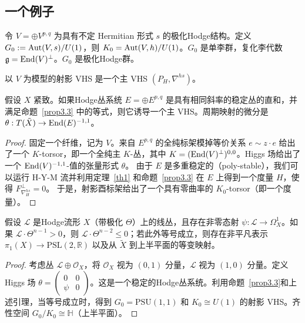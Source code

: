 \subsection{一个例子}

令 $V = \oplus V^{p,q}$ 为具有不定 Hermitian 形式 $s$ 的极化Hodge结构。定义 $G_0 := \operatorname{Aut}(V, s)/U(1)$，则 $K_0 = \operatorname{Aut}(V, h)/U(1)$。$G_0$ 是单李群，复化李代数 $\mathfrak{g} = \operatorname{End}(V)^\perp$。$G_0$ 是极化Hodge群。

\begin{definition}
以 $V$ 为模型的射影 VHS 是一个主 VHS $(P_H, \nabla^{hs})$。
\end{definition}

\begin{lemma}\label{lemmabundletovhs}
假设 $X$ 紧致。如果Hodge丛系统 $E = \oplus E^{p,q}$ 是具有相同斜率的稳定丛的直和，并满足命题~\ref{prop3.3} 中的等式，则它诱导一个主 VHS。周期映射的微分是 $\theta: T(\tilde{X}) \to \operatorname{End}(E)^{-1, 1}$。
\end{lemma}
\begin{proof}
固定一个纤维，记为 $V$。来自 $E^{p,q}$ 的全纯标架模掉等价关系 $e \sim z \cdot e$ 给出了一个 $K$-torsor，即一个全纯主 $K$-丛，其中 $K = (\operatorname{End}(V)^\perp)^{0,0}$。Higgs 场给出了一个 $\operatorname{End}(V)^{-1,1}$-值的张量形式 $\theta$。
由于 $E$ 是多重稳定的（poly-stable），我们可以运行 H-Y-M 流并利用定理~\ref{th1} 和命题~\ref{prop3.3} 在 $E$ 上得到一个度量 $H$，使得 $F^\perp_{\nabla^{hs}_H} = 0$。
于是，射影酉标架给出了一个具有零曲率的 $K_0$-torsor（即一个度量）。
\end{proof}

\begin{corollary}\label{examplecor}
假设 $\mathcal{L}$ 是Hodge流形 $X$（带极化 $\Theta$）上的线丛，且存在非零态射 $\psi: \mathcal{L} \to \Omega_X^1$。如果 $\mathcal{L} \cdot \Theta^{n-1} > 0$，则 $\mathcal{L} \cdot \Theta^{n-2} \le 0$；若此外等号成立，则存在非平凡表示 $\pi_1(X) \to \text{PSL}(2, \mathbb{R})$ 以及从 $\tilde{X}$ 到上半平面的等变映射。
\end{corollary}

\begin{proof}
考虑丛 $\mathcal{L} \oplus \mathcal{O}_X$，将 $\mathcal{O}_X$ 视为 $(0, 1)$ 分量，$\mathcal{L}$ 视为 $(1, 0)$ 分量。定义 Higgs 场 $\theta = \begin{pmatrix} 0 & 0 \\ \psi & 0 \end{pmatrix}$。这是一个稳定的Hodge丛系统。利用命题~\ref{prop3.3}和上述引理，当等号成立时，得到 $G_0 = \text{PSU}(1, 1)$ 和 $K_0 \cong U(1)$ 的射影 VHS。齐性空间 $G_0/K_0 \cong \mathbb{H}$（上半平面）。
\end{proof}
